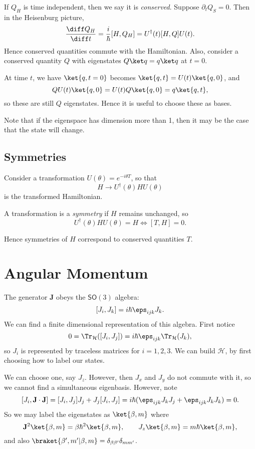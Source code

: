 \documentclass[12pt]{article}
\begin{document}
If $Q_H$ is time independent, then we say it is \emph{conserved}. Suppose $\partial_t Q_S = 0$. Then in the Heisenburg picture,
\[
	\frac{\diff Q_H}{\diff t} = \frac{i}{\hbar} [H, Q_H] = U^{\dagger}(t) [H,Q] U(t).
\]
Hence conserved quantities commute with the Hamiltonian. Also, consider a conserved quantity $Q$ with eigenstates $Q \ket q = q \ket q$ at $t = 0$.

At time $t$, we have $\ket{q,t=0}$ becomes $\ket{q, t} = U(t) \ket{q, 0}$, and
\[
	Q U(t) \ket{q, 0} = U(t) Q\ket{q,0} = q \ket{q, t},
\]
so these are still $Q$ eigenstates. Hence it is useful to choose these as bases.

Note that if the eigenspace has dimension more than 1, then it may be the case that the state will change.

\subsection{Symmetries}
\label{sub:symms}

Consider a transformation $U(\theta) = e^{-i\theta T}$, so that
\[
H \to U^{\dagger}(\theta) H U(\theta)
\]
is the transformed Hamiltonian.

\begin{definition}
	A transformation is a \emph{symmetry} if $H$ remains unchanged, so 
	\[
		U^{\dagger}(\theta) H U(\theta) = H \iff [T,H] = 0.
	\]
\end{definition}

Hence symmetries of $H$ correspond to conserved quantities $T$.


\newpage

\section{Angular Momentum}
\label{sec:ang_mom}

The generator $\mathbf{J}$ obeys the $\mathsf{SO}(3)$ algebra:
\[
	[J_i, J_k] = i\hbar \eps_{ijk}J_k.
\]
We can find a finite dimensional representation of this algebra. First notice
\[
	0 = \Tr_{\mathcal{H}}([J_i, J_j]) = i\hbar \eps_{ijk} \Tr_{\mathcal{H}}(J_k),
\]
so $J_i$ is represented by traceless matrices for $i = 1, 2, 3$. We can build $\mathcal{H}$, by first choosing how to label our states.

We can choose one, say $J_z$. However, then $J_{x}$ and $J_y$ do not commute with it, so we cannot find a simultaneous eigenbasis. However, note
\[
	[J_i, \mathbf{J} \cdot \mathbf{J}] = [J_i, J_j]J_j + J_j[J_i, J_j] = i\hbar (\eps_{ijk} J_k J_j + \eps_{ijk} J_k J_k) = 0.
\]
So we may label the eigenstates as $\ket{\beta, m}$ where
\[
	\mathbf{J}^2\ket{\beta,m} = \beta \hbar^2\ket{\beta, m}, \qquad J_z\ket{\beta, m} = m \hbar \ket{\beta, m},
\]
and also $\braket{\beta', m'|\beta,m} = \delta_{\beta\beta'}\delta_{mm'}$.
\end{document}

